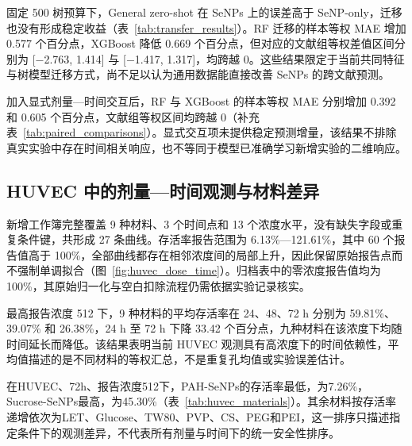 固定 500 树预算下，General zero-shot 在 SeNPs 上的误差高于 SeNP-only，迁移也没有形成稳定收益（表~\ref{tab:transfer_results}）。RF 迁移的样本等权 MAE 增加 0.577 个百分点，XGBoost 降低 0.669 个百分点，但对应的文献组等权差值区间分别为 [\ensuremath{\mathord{-}}2.763, 1.414] 与 [\ensuremath{\mathord{-}}1.417, 1.317]，均跨越 0。这些结果限定于当前共同特征与树模型迁移方式，尚不足以认为通用数据能直接改善 SeNPs 的跨文献预测。

\begin{table}[H]
\centering
\caption{固定 500 树预算的 General 到 SeNP 迁移对照。该对照采用预先指定参数，与表~\ref{tab:senp_main_results} 的嵌套选择主分析分别解释。}
\label{tab:transfer_results}
\small

\end{table}

加入显式剂量—时间交互后，RF 与 XGBoost 的样本等权 MAE 分别增加 0.392 和 0.605 个百分点，文献组等权区间均跨越 0（补充表~\ref{tab:paired_comparisons}）。显式交互项未提供稳定预测增量，该结果不排除真实实验中存在时间相关响应，也不等同于模型已准确学习新增实验的二维响应。

\subsection{HUVEC 中的剂量—时间观测与材料差异}

新增工作簿完整覆盖 9 种材料、3 个时间点和 13 个浓度水平，没有缺失字段或重复条件键，共形成 27 条曲线。存活率报告范围为 6.13\%—121.61\%，其中 60 个报告值高于 100\%，全部曲线都存在相邻浓度间的局部上升，因此保留原始报告点而不强制单调拟合（图~\ref{fig:huvec_dose_time}）。归档表中的零浓度报告值均为 100\%，其原始归一化与空白扣除流程仍需依据实验记录核实。

最高报告浓度 512 下，9 种材料的平均存活率在 24、48、72 h 分别为 59.81\%、39.07\% 和 26.38\%，24 h 至 72 h 下降 33.42 个百分点，九种材料在该浓度下均随时间延长而降低。该结果表明当前 HUVEC 观测具有高浓度下的时间依赖性，平均值描述的是不同材料的等权汇总，不是重复孔均值或实验误差估计。

在HUVEC、72h、报告浓度512下，PAH-SeNPs的存活率最低，为\nobreakspace{}7.26\%，Sucrose-SeNPs最高，为\nobreakspace{}45.30\%（表~\ref{tab:huvec_materials}）。其余材料按存活率递增依次为LET、Glucose、TW80、PVP、CS、PEG和PEI，这一排序只描述指定条件下的观测差异，不代表所有剂量与时间下的统一安全性排序。

\begin{table}[H]
\centering
\caption{报告浓度 512 下的材料描述符与 HUVEC 存活率。按 72 h 存活率递增排列。}
\label{tab:huvec_materials}
\small

\end{table}

